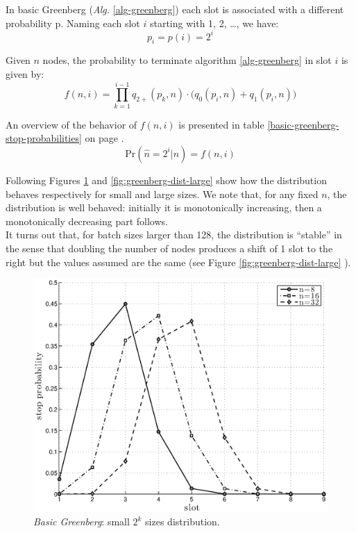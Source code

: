 \documentclass[12pt,a4paper]{report}
\begin{document}
In basic Greenberg (\emph{Alg.} \ref{alg-greenberg}) each slot is associated with a different probability p. Naming each slot $i$ starting with 1, 2, \dots, we have:
\begin{equation}
	p_{i}=p(i)=2^{i}
\end{equation}

Given $n$ nodes, the probability to terminate algorithm \ref{alg-greenberg} in slot $i$ is given by:
\begin{equation}
f(n,i)=\prod_{k=1}^{i-1}q_{2+}(p_{k},n) \cdot \bigl( q_{0}(p_{i},n)+q_{1}(p_{i},n)\bigr)  
\label{eq:bgstopprobability}
\end{equation}

An overview of the behavior of $f(n,i)$ is presented in table \ref{basic-greenberg-stop-probabilities} on page \pageref{basic-greenberg-stop-probabilities}.\\
\begin{equation}
\textrm{Pr}\left( \hat{n}=2^{i}|n\right)=f(n,i)  
\end{equation}

Following Figures \ref{fig:greenberg-dist-small} and \ref{fig:greenberg-dist-large} show how the distribution behaves respectively for small and large sizes.
We note that, for any fixed $n$, the distribution is well behaved: initially it is monotonically increasing, then a monotonically decreasing part follows.\\
It turns out that, for batch sizes larger than 128, the distribution is ``stable'' in the sense that doubling the number of nodes produces a shift of 1 slot to the right but the values assumed are the same (see Figure \ref{fig:greenberg-dist-large} ).\\


\begin{figure}[htbp]
\begin{center}
\includegraphics[scale=0.7]{matlab/Greenberg_stop_prob/greenberg-stop-distribution-uniformity-init}
\caption{\emph{Basic Greenberg}:  small $2^{k}$ sizes distribution.}
\label{fig:greenberg-dist-small}
\end{center}
\end{figure}
\end{document}
